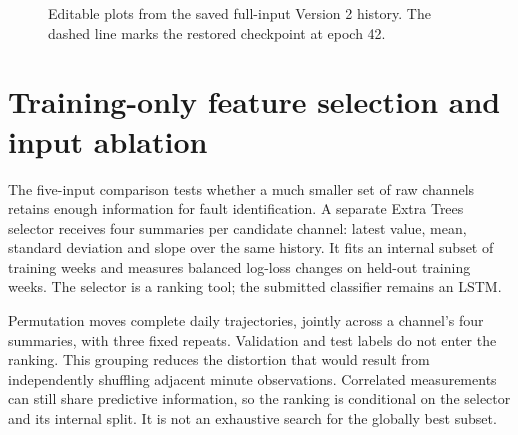 \begin{figure}[htbp]\centering
\begin{minipage}{0.48\linewidth}\centering
{}
\end{minipage}\hfill
\begin{minipage}{0.48\linewidth}\centering
{}
\end{minipage}
\caption{Editable plots from the saved full-input Version 2 history. The dashed line marks the restored checkpoint at epoch 42.}
\label{fig:learning}\end{figure}

\section{Training-only feature selection and input ablation}
The five-input comparison tests whether a much smaller set of raw channels retains enough information for fault identification. A separate Extra Trees selector receives four summaries per candidate channel: latest value, mean, standard deviation and slope over the same history. It fits an internal subset of training weeks and measures balanced log-loss changes on held-out training weeks. The selector is a ranking tool; the submitted classifier remains an LSTM.

Permutation moves complete daily trajectories, jointly across a channel's four summaries, with three fixed repeats. Validation and test labels do not enter the ranking. This grouping reduces the distortion that would result from independently shuffling adjacent minute observations. Correlated measurements can still share predictive information, so the ranking is conditional on the selector and its internal split. It is not an exhaustive search for the globally best subset.

